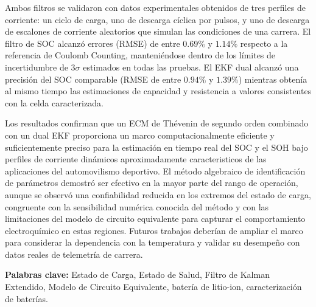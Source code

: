Ambos filtros se validaron con datos experimentales obtenidos de tres perfiles de corriente: un 
ciclo de carga, uno de descarga cíclica por pulsos, y uno de descarga de escalones de 
corriente aleatorios que simulan las condiciones de una carrera. El filtro de SOC 
alcanzó errores (RMSE) de entre $0.69\%$ y $1.14\%$ respecto a la 
referencia de Coulomb Counting, manteniéndose dentro de los límites de incertidumbre 
de $3\sigma$ estimados en todas las pruebas. El EKF dual alcanzó una precisión del SOC 
comparable (RMSE de entre $0.94\%$ y $1.39\%$) mientras obtenía al mismo tiempo las 
estimaciones de capacidad y resistencia a valores consistentes con la celda 
caracterizada.

Los resultados confirman que un \acs{ECM} de Thévenin de segundo orden combinado con un dual \acs{EKF} 
proporciona un marco computacionalmente eficiente y suficientemente preciso para 
la estimación en tiempo real del SOC y el SOH bajo perfiles de corriente dinámicos aproximadamente
caracteristicos de las aplicaciones del automovilismo deportivo. El método algebraico de 
identificación de parámetros demostró ser efectivo en la mayor parte del rango de 
operación, aunque se observó una confiabilidad reducida en los extremos del estado de 
carga, congruente con la sensibilidad numérica conocida del método y con las 
limitaciones del modelo de circuito equivalente para capturar el comportamiento 
electroquímico en estas regiones. Futuros trabajos deberían de ampliar el 
marco para considerar la dependencia con la temperatura y validar su desempeño con 
datos reales de telemetría de carrera.

\vspace{1em}
\noindent\textbf{Palabras clave:} Estado de Carga, Estado de Salud, Filtro de Kalman 
Extendido, Modelo de Circuito Equivalente, batería de litio-ion, caracterización de 
baterías.
